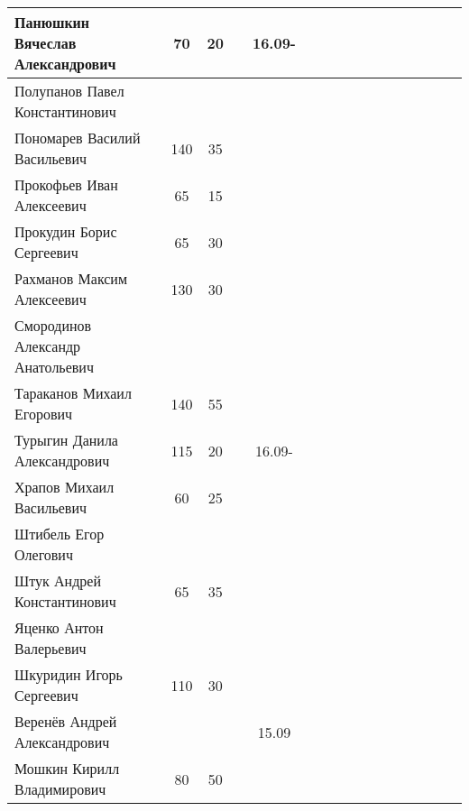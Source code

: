 \documentclass[a4paper,11pt]{article}
\begin{document}
\begin{tabular}{l|ccccccccccccccc}
Панюшкин Вячеслав Александрович	&70&20&&16.09- &\\
\midrule                                  
Полупанов Павел Константинович	&&&&       &\\
Пономарев Василий Васильевич	&140&35&&       &\\
Прокофьев Иван Алексеевич	&65&15&&       &\\	
Прокудин Борис Сергеевич	&65&30&&       &\\	
Рахманов Максим Алексеевич	&130&30&&       &\\	
Смородинов Александр Анатольевич&&&&       &\\	
Тараканов Михаил Егорович	&140&55&&       &\\	
Турыгин Данила Александрович	&115&20&&16.09- &\\
Храпов Михаил Васильевич	&60&25&&       &\\	
\midrule                                    
Штибель Егор Олегович		&&&&       &\\
Штук Андрей Константинович	&65&35&&       &\\	
Яценко Антон Валерьевич		&&&&       &\\
Шкуридин Игорь Сергеевич	&110&30&&       &\\	
Веренёв Андрей Александрович	&&&&15.09  &\\
Мошкин Кирилл Владимирович	&80&50&&       &\\	
\bottomrule
\end{tabular}
\end{document}
